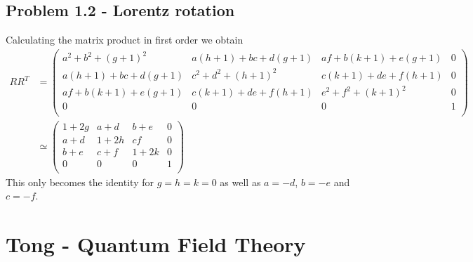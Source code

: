 \documentclass[10pt,a4paper]{book}
\theoremstyle{definition}
\begin{document}
\subsection{Problem 1.2 - Lorentz rotation}
Calculating the matrix product in first order we obtain
\begin{align}
R R^T&=\left(
\begin{array}{cccc}
 a^2+b^2+(g+1)^2 & a (h+1)+b c+d (g+1) & a f+b (k+1)+e (g+1) & 0 \\
 a (h+1)+b c+d (g+1) & c^2+d^2+(h+1)^2 & c (k+1)+d e+f (h+1) & 0 \\
 a f+b (k+1)+e (g+1) & c (k+1)+d e+f (h+1) & e^2+f^2+(k+1)^2 & 0 \\
 0 & 0 & 0 & 1 \\
\end{array}
\right)\\
&\simeq
\left(
\begin{array}{cccc}
 1+2g & a+d & b+e & 0 \\
 a+d & 1+2h & cf & 0 \\
 b+e & c+f & 1+2k & 0 \\
 0 & 0 & 0 & 1 \\
\end{array}
\right)
\end{align}
This only becomes the identity for $g=h=k=0$ as well as $a=-d$, $b=-e$ and $c=-f$.

\newpage
\section{{\sc Tong} - Quantum Field Theory}
\end{document}
